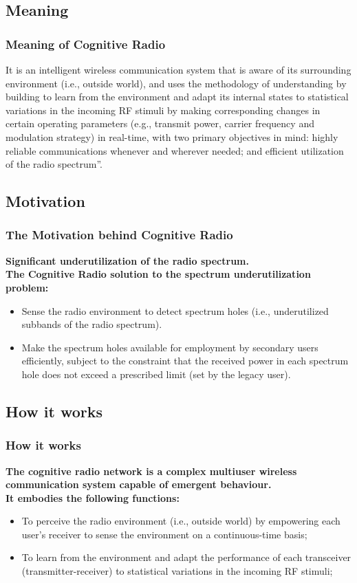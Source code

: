 \documentclass{beamer}
\begin{document}
\subsection{Meaning}
\begin{frame}
\frametitle{Meaning of Cognitive Radio}

It is an intelligent wireless communication system that is aware of its surrounding environment (i.e., outside world), and uses the methodology of understanding by building to learn from the environment and adapt its internal states to statistical variations in the incoming RF stimuli by making corresponding changes in certain operating parameters (e.g., transmit power, carrier frequency and modulation strategy) in real-time, with two primary objectives in mind: highly reliable communications whenever and wherever needed; and efficient utilization of the radio spectrum”.

\end{frame}

\subsection{Motivation}
\begin{frame}
\frametitle{The Motivation behind Cognitive Radio}
\textbf{Significant underutilization of the radio spectrum.}\\
\textbf{The Cognitive Radio solution to the spectrum underutilization problem:}
\begin{itemize}

\item Sense the radio environment to detect spectrum holes (i.e., underutilized subbands of the radio spectrum).
\item Make the spectrum holes available for employment by secondary users efficiently, subject to the constraint that the received power in each spectrum hole does not exceed a prescribed limit (set by the legacy user).

\end{itemize}
\end{frame}

\subsection{How it works}
\begin{frame}
\frametitle{How it works}
\textbf{The cognitive radio network is a complex multiuser wireless communication system capable of emergent behaviour.}\\
\textbf{It embodies the following functions:}
\begin{itemize}
\item To perceive the radio environment (i.e., outside world) by empowering each user’s receiver to sense the environment on a continuous-time basis;
\item To learn from the environment and adapt the performance of each transceiver (transmitter-receiver) to statistical variations in the incoming RF stimuli;
\end{itemize}
\end{frame}
\end{document}
